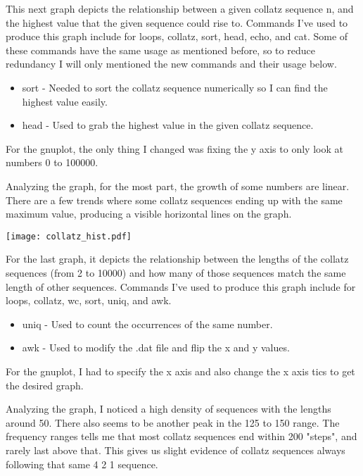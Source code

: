 \documentclass[11pt]{article}
\begin{document}
\noindent
This next graph depicts the relationship between a given collatz sequence n, and the highest value 
that the given sequence could rise to. Commands I've used to produce this graph include for loops, 
collatz, sort, head, echo, and cat. Some of these commands have the same usage as mentioned before, 
so to reduce redundancy I will only mentioned the new commands and their usage below.

\begin{itemize}
    \item
    sort - Needed to sort the collatz sequence numerically so I can find the highest value easily.
    \item
    head - Used to grab the highest value in the given collatz sequence.
\end{itemize}

\noindent
For the gnuplot, the only thing I changed was fixing the y axis to only look at numbers 0 to 100000.

\noindent
Analyzing the graph, for the most part, the growth of some numbers are linear. There are a few 
trends where some collatz sequences ending up with the same maximum value, producing a visible 
horizontal lines on the graph.


\begin{center}
\texttt{[image: collatz\_hist.pdf]}
\end{center}

\noindent
For the last graph, it depicts the relationship between the lengths of the collatz sequences (from 
2 to 10000) and how many of those sequences match the same length of other sequences. Commands I've 
used to produce this graph include for loops, collatz, wc, sort, uniq, and awk. 

\begin{itemize}
    \item
    uniq - Used to count the occurrences of the same number.
    \item
    awk - Used to modify the .dat file and flip the x and y values.
\end{itemize}

\noindent
For the gnuplot, I had to specify the x axis and also change the x axis tics to get the desired 
graph.

\noindent
Analyzing the graph, I noticed a high density of sequences with the lengths around 50. There also 
seems to be another peak in the 125 to 150 range. The frequency ranges tells me that most collatz 
sequences end within 200 "steps", and rarely last above that. This gives us slight evidence of 
collatz sequences always following that same 4 2 1 sequence.
\end{document}
